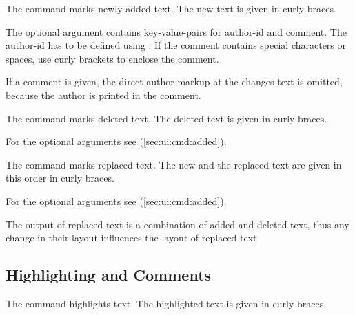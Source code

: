 

The command  marks newly added text.
The new text is given in curly braces.

The optional argument contains key-value-pairs for author-id and comment.
The author-id has to be defined using .
If the comment contains special characters or spaces, use curly brackets to enclose the comment.

If a comment is given, the direct author markup at the changes text is omitted, because the author is printed in the comment.





The command  marks deleted text.
The deleted text is given in curly braces.

For the optional arguments see  (\autoref{sec:ui:cmd:added}).






The command  marks replaced text.
The new and the replaced text are given in this order in curly braces.

For the optional arguments see  (\autoref{sec:ui:cmd:added}).

The output of replaced text is a combination of added and deleted text, thus any change in their layout influences the layout of replaced text.




\subsection{Highlighting and Comments}
\label{sec:ui:comment}

\localtableofcontents



The command  highlights text.
The highlighted text is given in curly braces.

